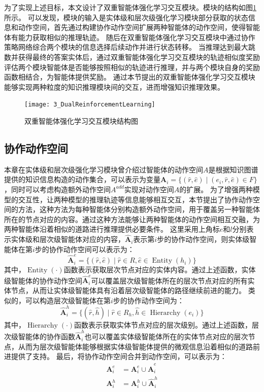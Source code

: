 \documentclass[algorithmlist, AutoFakeBold, AutoFakeSlant, figurelist, tablelist, nomlist, engineering]{seuthesix}
\begin{document}
为了实现上述目标，本文设计了双重智能体强化学习交互模块。模块的结构如图\ref{3_DualReinforcementLearning}所示。
可以发现，模块的输入是实体级和层次级强化学习模块部分获取的状态信息和动作空间，首先通过构建协作动作空间扩展两种智能体的动作空间，使得智能体有能力获取相似的推理轨迹。
随后在双重智能体强化学习交互模块中通过协作策略网络综合两个模块的信息选择后续动作并进行状态转移。
当推理达到最大跳数并获得最终的答案实体后，通过双重智能体强化学习交互模块的轨迹相似度奖励评估两个模块智能体是否能够按照相似的轨迹进行推理，并与两个模块自身的奖励函数相结合，为智能体提供奖励。
通过本节提出的双重智能体强化学习交互模块能够实现两种粒度的知识推理模块间的交互，进而增强知识推理效果。
\begin{figure}
  \centering
  \texttt{[image: 3\_DualReinforcementLearning]}
  \caption{双重智能体强化学习交互模块结构图}
  \label{3_DualReinforcementLearning}
\end{figure}

\subsection{协作动作空间}
本章在实体级和层次级强化学习模块曾介绍过智能体的动作空间$A$是根据知识图谱提供的知识信息构造的动作集合，可以表示为变量$\bm{A}_i = \{(\hat{r}, \hat{e}) \mid (e_i, \hat{r}, \hat{e}) \in F\}$，同时可以考虑构造额外动作空间$A^{add}$实现对动作空间$A$的扩展。
为了增强两种模型的交互性，让两种模型的推理轨迹等信息能够相互交互，本节提出了协作动作空间的方法，这种方法为每种智能体分别构造额外动作空间，用于覆盖另一种智能体所在的节点对应的内容。通过这种方法能够让两种智能体的动作空间相互交融，为两种智能体沿着相似的道路进行推理提供必要条件。
这里采用上角标$e$和$l$分别表示实体级和层次级智能体对应的内容，$\bm{\hat{A}}_i$表示第$i$步的协作动作空间，则实体级智能体在第$i$步的协作动作空间可以表示为：
\begin{equation}
  \bm{\hat{A}}_i^{e} = \{(\hat{r}, \hat{e}) \mid \hat{r} \in R, \hat{e} \in \operatorname{Entity}(h_i)\}
  \label{coo_1}
\end{equation}
其中，$\operatorname{Entity}(\cdot)$函数表示获取层次节点对应的实体内容。通过上述函数，实体级智能体的协作动作空间$\bm{\hat{A}}_i^{e}$可以覆盖层次级智能体所在的层次节点对应的所有实体节点，从而让实体级智能体具有沿着层次级智能体的路径继续前进的能力。
类似的，可以构造层次级智能体在第$i$步的协作动作空间为：
\begin{equation}
  \bm{\hat{A}}_i^{h} = \{(\hat{r}, \hat{h}) \mid \hat{r} \in R_h, \hat{h} \in \operatorname{Hierarchy}(e_i)\}
  \label{coo_2}
\end{equation}
其中，$\operatorname{Hierarchy}(\cdot)$函数表示获取实体节点对应的层次级别。通过上述函数，层次级智能体的协作函数$\bm{\hat{A}}_i^{h}$也可以覆盖实体级智能体所在的实体节点对应的层次节点，从而为层次级智能体能够根据实体级智能体提供的微观信息沿着相似的道路前进提供了支持。
最后，将协作动作空间合并到动作空间，可以表示为：
\begin{equation}
  \begin{aligned}
    \bm{A}_i^{e} &= \bm{A}_i^{e} \cup \bm{\hat{A}}_i^{e} \\
    \bm{A}_i^{h} &= \bm{A}_i^{h} \cup \bm{\hat{A}}_i^{h}
  \end{aligned}
\end{equation}
\end{document}
